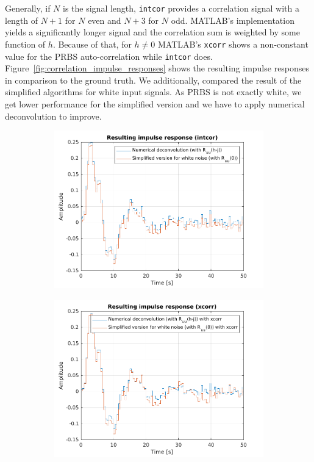 \documentclass{scrartcl}
\begin{document}
Generally, if $N$ is the signal length, \texttt{intcor} provides a correlation signal with a length of $N+1$ for $N$ even and $N+3$ for $N$ odd.
MATLAB's implementation yields a significantly longer signal and the correlation sum is weighted by some function of $h$.
Because of that, for $h\neq0$ MATLAB's \texttt{xcorr} shows a non-constant value for the PRBS auto-correlation while \texttt{intcor} does.
Figure~\ref{fig:correlation_impulse_responses} shows the resulting impulse responses in comparison to the ground truth.
We additionally, compared the result of the simplified algorithms for white input signals.
As PRBS is not exactly white, we get lower performance for the simplified version and we have to apply numerical deconvolution to improve.

\begin{figure}[h]
	\centering
	\begin{subfigure}{0.49\textwidth}
		\includegraphics[width=\textwidth]{figures/impulse_response_intcor.pdf}
		\label{fig:impulse_response_intcor}
	\end{subfigure}
	\begin{subfigure}{0.49\textwidth}
		\includegraphics[width=\textwidth]{figures/impulse_response_xcorr.pdf}

\end{subfigure}
\end{figure}
\end{document}
